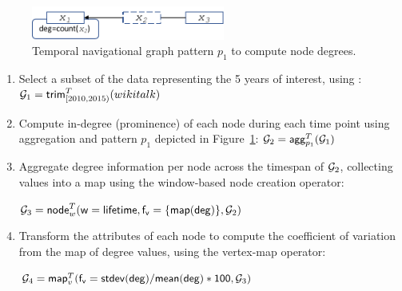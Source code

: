 %

\begin{figure}
\centering
\includegraphics[width=2.5in]{figs/degrees.pdf}
\vspace{-0.2cm}
\caption{Temporal navigational graph pattern $p_1$ to compute node degrees.}
\label{fig:degrees}
\vspace{-0.2cm}
\end{figure}

\begin{enumerate}[itemindent=\dimexpr\labelwidth+\labelsep\relax,leftmargin=0pt]
\item Select a subset of the data representing the 5 years of
  interest, using :  $\mathcal{G}_1 = \textsf{trim}^T_{[2010,2015)}(wikitalk)$

\item Compute in-degree (prominence) of each node during each time
  point using aggregation and pattern $p_1$ depicted in Figure~\ref{fig:degrees}:  $\mathcal{G}_2 = \textsf{agg}^T_{p_1}(\mathcal{G}_1)$

\item Aggregate degree information per node across the timespan of
  $\mathcal{G}_2$, collecting values into a map using the window-based node
  creation operator:

$\mathcal{G}_3 =\textsf{node}^T_w(\mathsf{w=lifetime},\mathsf{f_v=\{map(deg)\}},\mathcal{G}_2)$

\item Transform the attributes of each node to compute the
  coefficient of variation from the map of degree values, using the
  vertex-map operator:

$\mathcal{G}_4 = \textsf{map}^T_v(\mathsf{f_v=stdev(deg)/mean(deg)*100}, \mathcal{G}_3)$
\end{enumerate}

